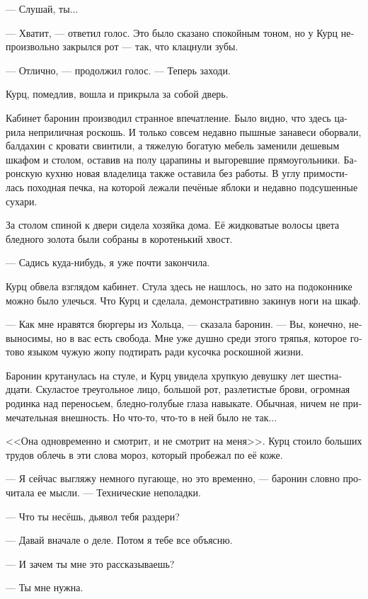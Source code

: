 \documentclass[a4paper,12pt,fleqn]{book}\usepackage{cooltooltips}\usepackage{polyglossia}\setdefaultlanguage[babelshorthands=true]{russian}\setotherlanguage{english}\defaultfontfeatures{Ligatures=TeX,Mapping=tex-text} \usepackage{xcolor}\definecolor{lightgray}{HTML}{bbbbbb}\color{lightgray}\newcommand{\ml}[3]{\textenglish{\textcolor{black}{#3}}}
\newcommand{\asterism}{\vspace{1em}{\centering\Large\bfseries$\ast~\ast~\ast$\par}\vspace{1em}}
\begin{document}
--- Слушай, ты...

--- Хватит, --- ответил голос.
Это было сказано спокойным тоном, но у Курц непроизвольно закрылся рот --- так, что клацнули зубы.

--- Отлично, --- продолжил голос.
--- Теперь заходи.

Курц, помедлив, вошла и прикрыла за собой дверь.

Кабинет баронин производил странное впечатление.
Было видно, что здесь царила неприличная роскошь.
И только совсем недавно пышные занавеси оборвали, балдахин с кровати свинтили, а тяжелую богатую мебель заменили дешевым шкафом и столом, оставив на полу царапины и выгоревшие прямоугольники.
Баронскую кухню новая владелица также оставила без работы.
В углу примостилась походная печка, на которой лежали печёные яблоки и недавно подсушенные сухари.

За столом спиной к двери сидела хозяйка дома.
Её жидковатые волосы цвета бледного золота были собраны в коротенький хвост.

--- Садись куда-нибудь, я уже почти закончила.

Курц обвела взглядом кабинет.
Стула здесь не нашлось, но зато на подоконнике можно было улечься.
Что Курц и сделала, демонстративно закинув ноги на шкаф.

--- Как мне нравятся бюргеры из Хольца, --- сказала баронин.
--- Вы, конечно, невыносимы, но в вас есть свобода.
Мне уже душно среди этого тряпья, которое готово языком чужую жопу подтирать ради кусочка роскошной жизни.

Баронин крутанулась на стуле, и Курц увидела хрупкую девушку лет шестнадцати.
Скуластое треугольное лицо, большой рот, разлетистые брови, огромная родинка над переносьем, бледно-голубые глаза навыкате.
Обычная, ничем не примечательная внешность.
Но что-то, что-то в ней было не так...

<<Она одновременно и смотрит, и не смотрит на меня>>.
Курц стоило больших трудов облечь в эти слова мороз, который пробежал по её коже.

--- Я сейчас выгляжу немного пугающе, но это временно, --- баронин словно прочитала ее мысли.
--- Технические неполадки.

--- Что ты несёшь, дьявол тебя раздери?

--- Давай вначале о деле.
Потом я тебе все объясню.

\asterism

--- И зачем ты мне это рассказываешь?

--- Ты мне нужна.
\end{document}
